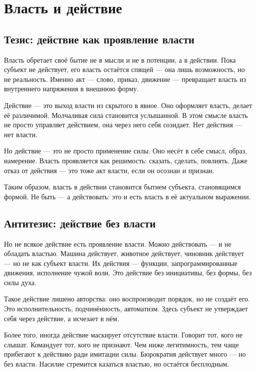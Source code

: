 \chapter{Власть и действие}

\section{Тезис: действие как проявление власти}

Власть обретает своё бытие не в мысли и не в потенции, а в действии. Пока субъект не действует, его власть остаётся спящей — она лишь возможность, но не реальность. Именно акт — слово, приказ, движение — превращает власть из внутреннего напряжения в внешнюю форму.

Действие — это выход власти из скрытого в явное. Оно оформляет власть, делает её различимой. Молчаливая сила становится услышанной. В этом смысле власть не просто управляет действием, она через него себя созидает. Нет действия — нет власти.

Но действие — это не просто применение силы. Оно несёт в себе смысл, образ, намерение. Власть проявляется как решимость: сказать, сделать, повлиять. Даже отказ от действия — это тоже акт власти, если он осознан и признан.

Таким образом, власть в действии становится бытием субъекта, становящимся формой. Не быть — а действовать: это и есть власть в её актуальном выражении.

\section{Антитезис: действие без власти}

Но не всякое действие есть проявление власти. Можно действовать — и не обладать властью. Машина действует, животное действует, чиновник действует — но не как субъект власти. Их действия — функции, запрограммированные движения, исполнение чужой воли. Это действие без инициативы, без формы, без силы духа.

Такое действие лишено авторства: оно воспроизводит порядок, но не создаёт его. Это исполнительность, подчинённость, автоматизм. Здесь субъект не утверждает себя через действие, а исчезает в нём.

Более того, иногда действие маскирует отсутствие власти. Говорит тот, кого не слышат. Командует тот, кого не признают. Чем ниже легитимность, тем чаще прибегают к действию ради имитации силы. Бюрократия действует много — но без власти. Насилие стремится казаться властью, но остаётся бесплодным.

